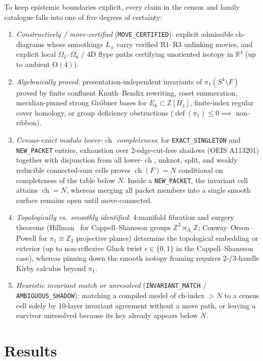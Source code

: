 \documentclass[11pt]{amsart}
\newcommand{\ch}{\operatorname{ch}}
\newcommand{\Z}{\mathbb{Z}}
\newcommand{\lab}[1]{\texttt{#1}}
\theoremstyle{plain}
\theoremstyle{remark}
\begin{document}
To keep epistemic boundaries explicit, every claim in the census and family catalogue falls into one of five
degrees of certainty:
\begin{enumerate}[leftmargin=*]
\item \emph{Constructively / move-certified} (\lab{MOVE\_CERTIFIED}): explicit admissible ch-diagrams whose
smoothings $L_\pm$ carry verified $\mathrm{R1}$--$\mathrm{R3}$ unlinking movies, and explicit local
$\Omega_1$--$\Omega_8$ / 4D flype paths certifying unoriented isotopy in $\mathbb{R}^4$ (up to ambient
$\mathrm{O}(4)$).
\item \emph{Algebraically proved}: presentation-independent invariants of $\pi_1(S^4\setminus F)$ proved by
finite confluent Knuth--Bendix rewriting, coset enumeration, meridian-pinned strong Gr\"obner bases for
$E_k\subset\Z[H_1]$, finite-index regular cover homology, or group deficiency obstructions
($\operatorname{def}(\pi_1)\le 0\implies$ non-ribbon).
\item \emph{Census-exact modulo lower-$\ch$ completeness}: for \lab{EXACT\_SINGLETON} and \lab{NEW\_PACKET}
entries, exhaustion over 2-edge-cut-free shadows (OEIS A113201) together with disjunction from all
lower-$\ch$, unknot, split, and weakly reducible connected-sum cells proves $\ch(F)=N$ conditional on
completeness of the table below $N$. Inside a \lab{NEW\_PACKET}, the invariant cell attains $\ch=N$, whereas
merging all packet members into a single smooth surface remains open until move-connected.
\item \emph{Topologically vs.\ smoothly identified}: 4-manifold fibration and surgery theorems (Hillman~\cite{Hil}
for Cappell--Shaneson groups $\Z^3\rtimes_{A_i}\Z$; Conway--Orson--Powell for $\pi_1\cong\Z_2$ projective
planes) determine the topological embedding or exterior (up to non-reflexive Gluck twist
$\epsilon\in\{0,1\}$ in the Cappell--Shaneson case), whereas pinning down the smooth isotopy framing
requires 2-/3-handle Kirby calculus beyond $\pi_1$.
\item \emph{Heuristic invariant match or unresolved} (\lab{INVARIANT\_MATCH} / \lab{AMBIGUOUS\_SHADOW}):
matching a compiled model of ch-index $>N$ to a census cell solely by 10-layer invariant agreement without a
move path, or leaving a survivor unresolved because its key already appears below $N$.
\end{enumerate}

\section{Results}
\end{document}
